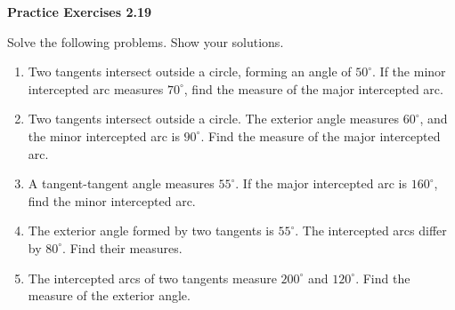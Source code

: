 \vspace{0.3ex}
\noindent\textbf{Practice Exercises 2.19}

\vspace{0.2ex}

Solve the following problems. Show your solutions.

\begin{enumerate}
    \item Two tangents intersect outside a circle, forming an angle of $50^\circ$. If the minor intercepted arc measures $70^\circ$, find the measure of the major intercepted arc.
    \item Two tangents intersect outside a circle. The exterior angle measures $60^\circ$, and the minor intercepted arc is $90^\circ$. Find the measure of the major intercepted arc.
    \item A tangent-tangent angle measures $55^\circ$. If the major intercepted arc is $160^\circ$, find the minor intercepted arc.
    \item The exterior angle formed by two tangents is $55^\circ$. The intercepted arcs differ by $80^\circ$. Find their measures.
    \item The intercepted arcs of two tangents measure $200^\circ$ and $120^\circ$. Find the measure of the exterior angle.
\end{enumerate}
